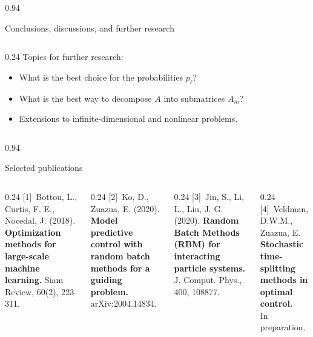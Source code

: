 \documentclass[mathserif]{beamer}
\begin{document}
\begin{frame}
\begin{columns}[t]
\begin{column}{0.94\textwidth}
\begin{block}{Conclusions, discussions, and further research}
\begin{columns}
    \begin{column}{0.24\textwidth}
    Topics for further research:
\begin{itemize}
\item What is the best choice for the probabilities $p_\ell$?
\item What is the best way to decompose $A$ into submatrices $A_m$?
\item Extensions to infinite-dimensional and nonlinear problems. 
\end{itemize}
\vspace{0.9cm} 
\end{column}
\end{columns}
\end{block}
\end{column}
\end{columns}

    \vspace{0cm}
    
\begin{columns}
  \begin{column}{0.94\textwidth}
    \begin{block}{Selected publications}
      \begin{columns}[T]
        \begin{column}{0.24\textwidth}
          [1]\ Bottou, L., Curtis, F. E., Nocedal, J. (2018). {\bf Optimization methods for large-scale machine learning.} Siam Review, 60(2), 223-311.
        \end{column}
        \begin{column}{0.24\textwidth}
          [2]\ Ko, D., Zuazua, E. (2020). {\bf Model predictive control with random batch methods for a guiding problem.} arXiv:2004.14834.
        \end{column}
        \begin{column}{0.24\textwidth}
          [3]\ Jin, S., Li, L., Liu, J. G. (2020). {\bf Random Batch Methods (RBM) for interacting particle systems.} J. Comput. Phys., 400, 108877.
        \end{column}
        \begin{column}{0.24\textwidth}
          [4]\ Veldman, D.W.M., Zuazua, E. {\bf Stochastic time-splitting methods in optimal control.} \\ In preparation. 
        \end{column}
      \end{columns}
    \end{block}
  \end{column}
\end{columns}

\end{frame}
\end{document}
